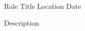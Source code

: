 

\begin{cventries}

  \cventry
    {Role} %
    {Title} %
    {Location} %
    {Date} %
    {
      \begin{cvitems} %
        \item {Description}
      \end{cvitems}
    }


\end{cventries}
